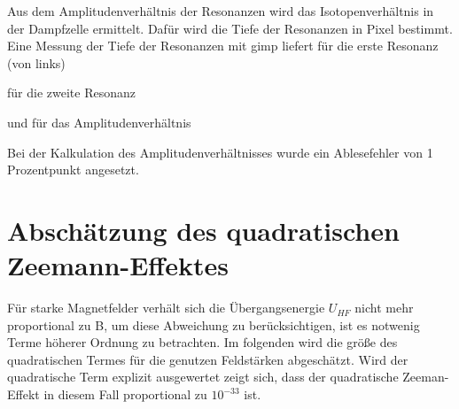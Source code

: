 Aus dem Amplitudenverhältnis der Resonanzen wird das Isotopenverhältnis in der
Dampfzelle ermittelt. Dafür wird die Tiefe der Resonanzen in Pixel bestimmt.
Eine Messung der Tiefe der Resonanzen mit gimp liefert für die erste Resonanz (von links)



für die zweite Resonanz



und für das Amplitudenverhältnis



Bei der Kalkulation des Amplitudenverhältnisses wurde ein Ablesefehler von 1 Prozentpunkt
angesetzt.

\section{Abschätzung des quadratischen Zeemann-Effektes}
Für starke Magnetfelder verhält sich die Übergangsenergie $U_{HF}$ nicht mehr proportional zu B, um diese Abweichung zu berücksichtigen, ist es notwenig Terme höherer Ordnung zu betrachten.
Im folgenden wird die größe des quadratischen Termes für die genutzen Feldstärken abgeschätzt. Wird der quadratische Term explizit ausgewertet zeigt sich, dass der quadratische Zeeman-Effekt
in diesem Fall proportional zu $10^{-33}$ ist.
